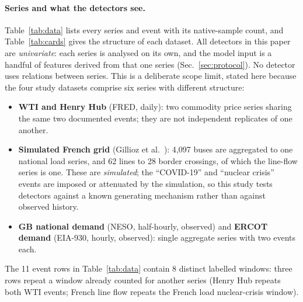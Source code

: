 \documentclass[10pt,twocolumn]{article}
\begin{document}
\paragraph{Series and what the detectors see.} Table~\ref{tab:data} lists every series and event with its native-sample count, and Table~\ref{tab:cards} gives the structure of each dataset. All detectors in this paper are \emph{univariate}: each series is analysed on its own, and the model input is a handful of features derived from that one series (Sec.~\ref{sec:protocol}). No detector uses relations between series. This is a deliberate scope limit, stated here because the four study datasets comprise six series with different structure:
\begin{itemize}
\item \textbf{WTI and Henry Hub} (FRED, daily): two commodity price series sharing the same two documented events; they are not independent replicates of one another.
\item \textbf{Simulated French grid} (Gillioz et al.~\cite{gillioz2025dataset}): 4{,}097 buses are aggregated to one national load series, and 62 lines to 28 border crossings, of which the line-flow series is one. These are \emph{simulated}; the ``COVID-19'' and ``nuclear crisis'' events are imposed or attenuated by the simulation, so this study tests detectors against a known generating mechanism rather than against observed history.
\item \textbf{GB national demand} (NESO, half-hourly, observed) and \textbf{ERCOT demand} (EIA-930, hourly, observed): single aggregate series with two events each.
\end{itemize}
The 11 event rows in Table~\ref{tab:data} contain 8 distinct labelled windows: three rows repeat a window already counted for another series (Henry Hub repeats both WTI events; French line flow repeats the French load nuclear-crisis window).

\begin{table}[t]
\centering\scriptsize\setlength{\tabcolsep}{3.5pt}

\caption{Series, resolution, data type and events with duration in calendar days and native samples. ``Synthetic'' = simulated grid~\cite{gillioz2025dataset}. Events are inclusive calendar dates.}\label{tab:data}
\end{table}
\end{document}
